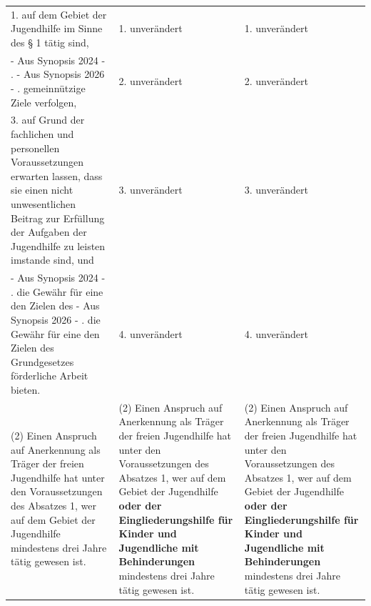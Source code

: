 \documentclass[10pt,a4paper,landscape]{article}
\begin{document}
\begin{longtable}{|L{8.2cm}|L{8.2cm}|L{8.2cm}|}
\hhline{|---|}
1.  \newline auf dem Gebiet der Jugendhilfe im Sinne  \newline des \S{} 1 tätig sind, & 1. unverändert & 1. unverändert \\
\hhline{|---|}
- Aus Synopsis 2024 - .  \newline - Aus Synopsis 2026 - .  \newline gemeinnützige Ziele verfolgen, & 2. unverändert & 2. unverändert \\
\hhline{|---|}
3.  \newline auf Grund der fachlichen und personellen  \newline Voraussetzungen erwarten lassen, dass  \newline sie einen nicht unwesentlichen Beitrag zur  \newline Erfüllung der Aufgaben der Jugendhilfe zu  \newline leisten imstande sind, und & 3. unverändert & 3. unverändert \\
\hhline{|---|}
- Aus Synopsis 2024 - .  \newline die Gewähr für eine den Zielen des  \newline - Aus Synopsis 2026 - .  die Gewähr für eine den Zielen des  \newline Grundgesetzes förderliche Arbeit bieten. & 4. unverändert & 4. unverändert \\
\hhline{|---|}
(2) Einen Anspruch auf Anerkennung als  \newline Träger der freien Jugendhilfe hat unter den  \newline Voraussetzungen des Absatzes 1, wer auf  \newline dem Gebiet der Jugendhilfe mindestens  \newline drei Jahre tätig gewesen ist. & (2) Einen Anspruch auf Anerkennung als  \newline Träger der freien Jugendhilfe hat unter den  \newline Voraussetzungen des Absatzes 1, wer auf  \newline dem Gebiet der Jugendhilfe \textbf{oder der  \newline Eingliederungshilfe für Kinder und  \newline Jugendliche mit Behinderungen} \newline mindestens drei Jahre tätig gewesen ist. & (2) Einen Anspruch auf Anerkennung als  \newline Träger der freien Jugendhilfe hat unter den  \newline Voraussetzungen des Absatzes 1, wer auf  \newline dem Gebiet der Jugendhilfe \textbf{oder der  \newline Eingliederungshilfe für Kinder und  \newline Jugendliche mit Behinderungen} \newline mindestens drei Jahre tätig gewesen ist. \\

\end{longtable}
\end{document}
